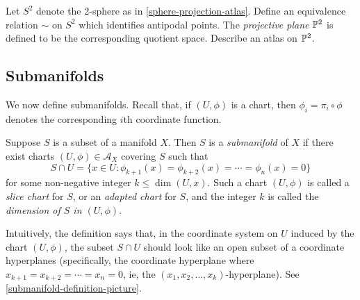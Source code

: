 \begin{exercise} \label{rp2}  
	Let $S^2$ denote the 2-sphere as in \cref{sphere-projection-atlas}. Define an equivalence relation $\sim$ on $S^2$ which identifies antipodal points. The \emph{projective plane} $\mathbb{P}^2$ is defined to be the corresponding quotient space. Describe an atlas on $\mathbb{P}^2$. 
\end{exercise}

\subsection{Submanifolds}

We now define submanifolds. Recall that, if $(U, \phi)$ is a chart, then $\phi_i = \pi_i \circ \phi$ denotes the corresponding $i$th coordinate function. 

\begin{definition} \label{submanifold}
	Suppose $S$ is a subset of a manifold $X$. Then $S$ is a \emph{submanifold} of $X$ if there exist charts $(U, \phi) \in \mathscr{A}_X$ covering $S$ such that 
	\[ S \cap U = \{ x \in U :  \phi_{k+1}(x) = \phi_{k+2}(x) = \dotsb = \phi_n(x) = 0 \} \]
	for some non-negative integer $k \leq \dim(U,x)$. Such a chart $(U,\phi)$ is called a \emph{slice chart} for $S$, or an \emph{adapted chart} for $S$, and the integer $k$ is called the \emph{dimension of $S$ in $(U,\phi)$}. 
\end{definition}

Intuitively, the definition says that, in the coordinate system on $U$ induced by the chart $(U, \phi)$, the subset $S \cap U$ should look like an open subset of a coordinate hyperplanes (specifically, the coordinate hyperplane where $x_{k+1} = x_{k+2} = \dotsb = x_n = 0$, ie, the $(x_1, x_2, \dotsc, x_k)$-hyperplane). See \cref{submanifold-definition-picture}. 

